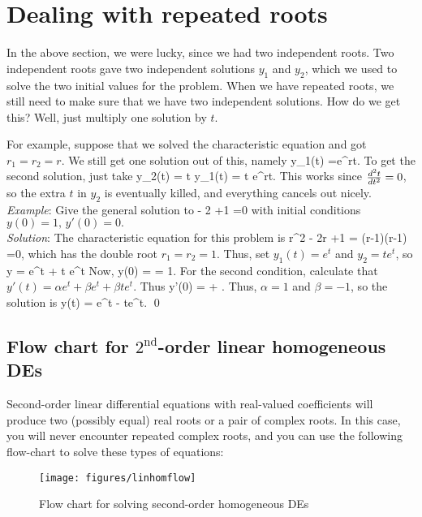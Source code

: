 \documentclass[12pt]{book}
\begin{document}
\section{Dealing with repeated roots}
In the above section, we were lucky, since we had two independent roots.
Two independent roots gave two independent solutions $y_1$ and $y_2$, which
we used to solve the two initial values for the problem. When we have
repeated roots, we still need to make sure that we have two independent
solutions. How do we get this? Well, just multiply one solution by $t$.

For example, suppose that we solved the characteristic equation and got
$r_1=r_2=r$. We still get one solution out of this, namely
\bee
y_1(t) =e^{rt}.
\eee
To get the second solution, just take
\bee
y_2(t) = t y_1(t) = t e^{rt}.
\eee
This works since $\frac{d^2 t}{d t^2}=0$, so the extra $t$ in $y_2$ is eventually
killed, and everything cancels out nicely.
\\

\noindent\emph{Example}: Give the general solution to
\bee
{} - 2 +1 =0
\eee
with initial conditions $y(0) =1, \, y'(0) =0.$\\
\noindent\emph{Solution}:
The characteristic equation for this problem is
\bee
r^2 - 2r +1 = (r-1)(r-1) =0,
\eee
which has the double root $r_1=r_2=1$. Thus, set
$y_1(t) = e^t$ and $y_2=t e^t$, so
\bee
y = \alpha e^t + \beta t e^t
\eee
Now,
\bee
y(0) = \alpha = 1.
\eee
For the second condition, calculate that
$y'(t) = \alpha e^t + \beta e^t + \beta te^t$. Thus
\bee
y'(0) = \alpha + .
\eee
Thus, $\alpha=1$ and $\beta =-1$, so the solution is
\bee
y(t) = e^t - te^t. \qed
\eee

\newpage
\subsection{Flow chart for $2^{\text{nd}}$-order linear homogeneous DEs}

Second-order linear differential equations with real-valued
coefficients will produce two (possibly equal) real roots or a pair of
complex roots.  In this case, you will never encounter repeated
complex roots, and you can use the following flow-chart to solve these
types of equations:

\vspace{0.5in}
\begin{figure}[h]
  \centering
  \texttt{[image: figures/linhomflow]}
  \caption{Flow chart for solving second-order homogeneous DEs}
  \label{fig:linhomflow}
\end{figure}
\end{document}
